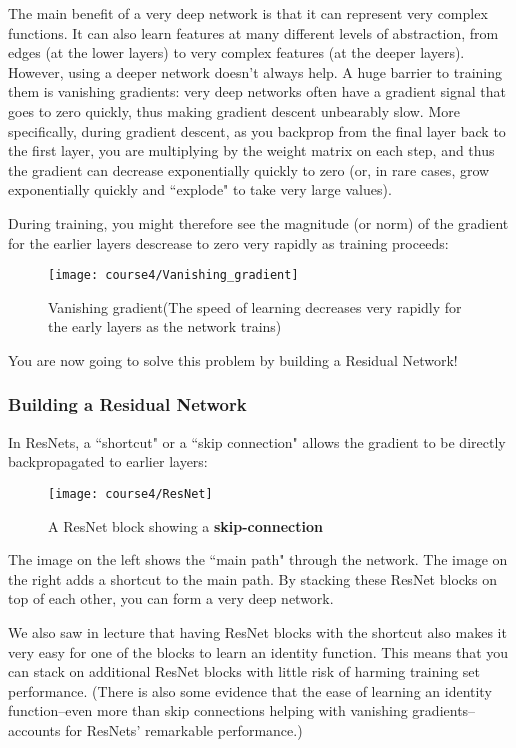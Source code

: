 The main benefit of a very deep network is that it can represent very complex functions. It can also learn features at many different levels of abstraction, from edges (at the lower layers) to very complex features (at the deeper layers). However, using a deeper network doesn't always help. A huge barrier to training them is vanishing gradients: very deep networks often have a gradient signal that goes to zero quickly, thus making gradient descent unbearably slow. More specifically, during gradient descent, as you backprop from the final layer back to the first layer, you are multiplying by the weight matrix on each step, and thus the gradient can decrease exponentially quickly to zero (or, in rare cases, grow exponentially quickly and ``explode" to take very large values).

During training, you might therefore see the magnitude (or norm) of the gradient for the earlier layers descrease to zero very rapidly as training proceeds:
\begin{figure}[h]
\begin{center}
\texttt{[image: course4/Vanishing\_gradient]}
\caption{Vanishing gradient(The speed of learning decreases very rapidly for the early layers as the network trains)}
\end{center}
\end{figure}

You are now going to solve this problem by building a Residual Network!


\subsubsection{Building a Residual Network}

In ResNets, a ``shortcut" or a ``skip connection" allows the gradient to be directly backpropagated to earlier layers:
\begin{figure}[h]
\begin{center}
\texttt{[image: course4/ResNet]}
\caption{A ResNet block showing a {\textbf{skip-connection}}}
\end{center}
\end{figure}

The image on the left shows the ``main path" through the network. The image on the right adds a shortcut to the main path. By stacking these ResNet blocks on top of each other, you can form a very deep network.

We also saw in lecture that having ResNet blocks with the shortcut also makes it very easy for one of the blocks to learn an identity function. This means that you can stack on additional ResNet blocks with little risk of harming training set performance. (There is also some evidence that the ease of learning an identity function--even more than skip connections helping with vanishing gradients--accounts for ResNets' remarkable performance.)


